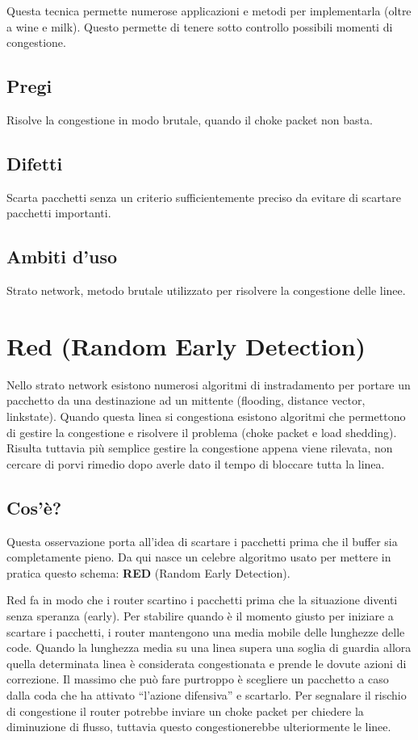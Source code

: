 Questa tecnica permette numerose applicazioni e metodi per implementarla (oltre a wine e milk). Questo permette di tenere sotto controllo possibili momenti di congestione.

\subsection{Pregi}
Risolve la congestione in modo brutale, quando il choke packet non basta.

\subsection{Difetti}
Scarta pacchetti senza un criterio sufficientemente preciso da evitare di scartare pacchetti importanti.

\subsection{Ambiti d'uso}
Strato network, metodo brutale utilizzato per risolvere la congestione delle linee.

\section{Red (Random Early Detection)}

Nello strato network esistono numerosi algoritmi di instradamento per portare un pacchetto da una destinazione ad un mittente (flooding, distance vector, linkstate). Quando questa linea si congestiona esistono algoritmi che permettono di gestire la congestione e risolvere il problema (choke packet e load shedding). Risulta tuttavia più semplice gestire la congestione appena viene rilevata, non cercare di porvi rimedio dopo averle dato il tempo di bloccare tutta la linea.
\subsection{Cos'è?}
Questa osservazione porta all'idea di scartare i pacchetti prima che il buffer sia completamente pieno. Da qui nasce un celebre algoritmo usato per mettere in pratica questo schema: \textbf{RED} (Random Early Detection).

Red fa in modo che i router scartino i pacchetti prima che la situazione diventi senza speranza (early). Per stabilire quando è il momento giusto per iniziare a scartare i pacchetti, i router mantengono una media mobile delle lunghezze delle code. Quando la lunghezza media su una linea supera una soglia di guardia allora quella determinata linea è considerata congestionata e prende le dovute azioni di correzione. Il massimo che può fare purtroppo è scegliere un pacchetto a caso dalla coda che ha attivato “l'azione difensiva” e scartarlo. Per segnalare il rischio di congestione il router potrebbe inviare un choke packet per chiedere la diminuzione di flusso, tuttavia questo congestionerebbe ulteriormente le linee.

